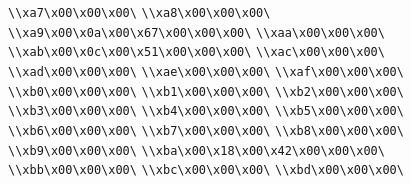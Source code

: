 \verb|\\xa7\x00\x00\x00\|\newline
\verb|\\xa8\x00\x00\x00\|\newline
\verb|\\xa9\x00\x0a\x00\x67\x00\x00\x00\|\newline
\verb|\\xaa\x00\x00\x00\|\newline
\verb|\\xab\x00\x0c\x00\x51\x00\x00\x00\|\newline
\verb|\\xac\x00\x00\x00\|\newline
\verb|\\xad\x00\x00\x00\|\newline
\verb|\\xae\x00\x00\x00\|\newline
\verb|\\xaf\x00\x00\x00\|\newline
\verb|\\xb0\x00\x00\x00\|\newline
\verb|\\xb1\x00\x00\x00\|\newline
\verb|\\xb2\x00\x00\x00\|\newline
\verb|\\xb3\x00\x00\x00\|\newline
\verb|\\xb4\x00\x00\x00\|\newline
\verb|\\xb5\x00\x00\x00\|\newline
\verb|\\xb6\x00\x00\x00\|\newline
\verb|\\xb7\x00\x00\x00\|\newline
\verb|\\xb8\x00\x00\x00\|\newline
\verb|\\xb9\x00\x00\x00\|\newline
\verb|\\xba\x00\x18\x00\x42\x00\x00\x00\|\newline
\verb|\\xbb\x00\x00\x00\|\newline
\verb|\\xbc\x00\x00\x00\|\newline
\verb|\\xbd\x00\x00\x00\|\newline
